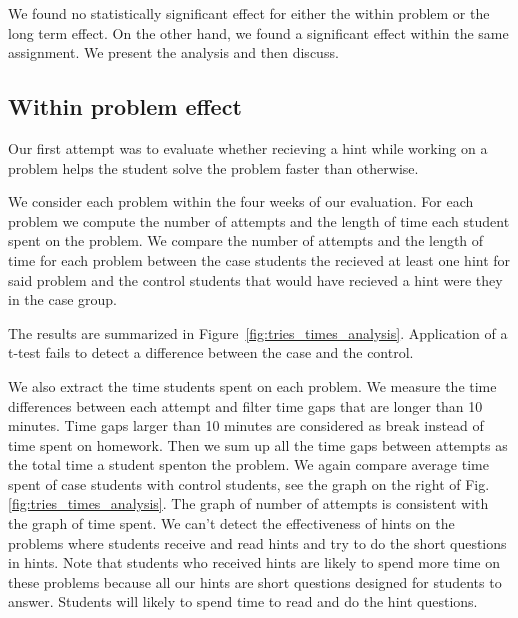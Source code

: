 \documentclass{llncs}
\begin{document}
We found no statistically significant effect for either the within problem or
the long term effect. On the other hand, we found a significant effect
within the same assignment. We present the analysis and then discuss.

\subsection{Within problem effect}

Our first attempt was to evaluate whether recieving a hint while
working on a problem helps the student solve the problem faster than
otherwise.

We consider each problem within the four weeks of our evaluation. For
each problem we compute the number of attempts and the length of time
each student spent on the problem. We compare the number of attempts
and the length of time for each problem between the case students the
recieved at least one hint for said problem and the control students
that would have recieved a hint were they in the case group.

The results are summarized in
Figure~\ref{fig:tries_times_analysis}. Application of a t-test fails
to detect a difference between the case and the control.

\iffalse
We also extract the time students spent on each problem. We measure the time differences between each attempt and filter time gaps that are longer than 10 minutes. Time gaps larger than 10 minutes are considered as break instead of time spent on homework. Then we sum up all the time gaps between attempts as the total time a student spenton the problem. We again compare average time spent of case students with control students, see the graph on the right of Fig. \ref{fig:tries_times_analysis}. The graph of number of attempts is consistent with the graph of time spent. We can't detect the effectiveness of hints on the problems where students receive and read hints and try to do the short questions in hints. Note that students who received hints are likely to spend more time on these problems because all our hints are short questions designed for students to answer. Students will likely to spend time to read and do the hint questions.
\end{document}
